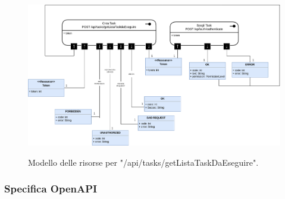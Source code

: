 \documentclass{report}
\begin{document}
\begin{figure}[H]
	\centering\includegraphics[width=1\textwidth]{images/model_da_eseguire.png}
	
	Modello delle risorse per "/api/tasks/getListaTaskDaEseguire".
\end{figure}

\subsubsection*{Specifica OpenAPI}
\end{document}
